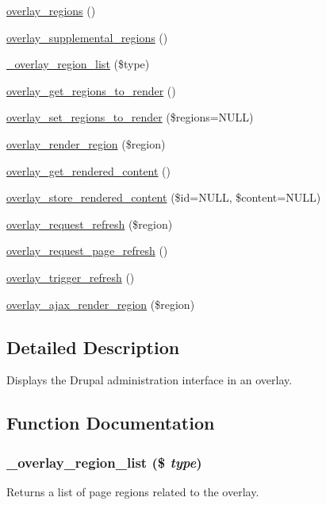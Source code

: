 \begin{DoxyCompactItemize}
\item 
\hyperlink{overlay_8module_abc2ab232b7d87656670589aacbf8f97c}{overlay\_\-regions} ()
\item 
\hyperlink{overlay_8module_a450e5cee4c93de608b64aa7b3fc8cfe4}{overlay\_\-supplemental\_\-regions} ()
\item 
\hyperlink{overlay_8module_a0da6152f3cb0b93bb02b7f34122e03c9}{\_\-overlay\_\-region\_\-list} (\$type)
\item 
\hyperlink{overlay_8module_a1881ec6bb74538db7efd8bbd374d00e7}{overlay\_\-get\_\-regions\_\-to\_\-render} ()
\item 
\hyperlink{overlay_8module_a85425da3ee5e291413da34bf6d966411}{overlay\_\-set\_\-regions\_\-to\_\-render} (\$regions=NULL)
\item 
\hyperlink{overlay_8module_ad120052a1e2705ffb8b684e261875f21}{overlay\_\-render\_\-region} (\$region)
\item 
\hyperlink{overlay_8module_a3dc272e9d1defe33078ae1c168acad24}{overlay\_\-get\_\-rendered\_\-content} ()
\item 
\hyperlink{overlay_8module_a83ad6249c4b5cf10dfc5a810dec1a800}{overlay\_\-store\_\-rendered\_\-content} (\$id=NULL, \$content=NULL)
\item 
\hyperlink{overlay_8module_aed708a9891795f894ceaba04627c752c}{overlay\_\-request\_\-refresh} (\$region)
\item 
\hyperlink{overlay_8module_a4b08054849bbe3885aa4d8bb7479012e}{overlay\_\-request\_\-page\_\-refresh} ()
\item 
\hyperlink{overlay_8module_ae3025a7d3191c492aa55e2bcf1518e67}{overlay\_\-trigger\_\-refresh} ()
\item 
\hyperlink{overlay_8module_a31a27bee3e7a1abbf1de30520ac521ec}{overlay\_\-ajax\_\-render\_\-region} (\$region)
\end{DoxyCompactItemize}


\subsection{Detailed Description}
Displays the Drupal administration interface in an overlay. 

\subsection{Function Documentation}
\hypertarget{overlay_8module_a0da6152f3cb0b93bb02b7f34122e03c9}{
\subsubsection[{\_\-overlay\_\-region\_\-list}]{\setlength{\rightskip}{0pt plus 5cm}\_\-overlay\_\-region\_\-list (\$ {\em type})}}
\label{overlay_8module_a0da6152f3cb0b93bb02b7f34122e03c9}
Returns a list of page regions related to the overlay.


